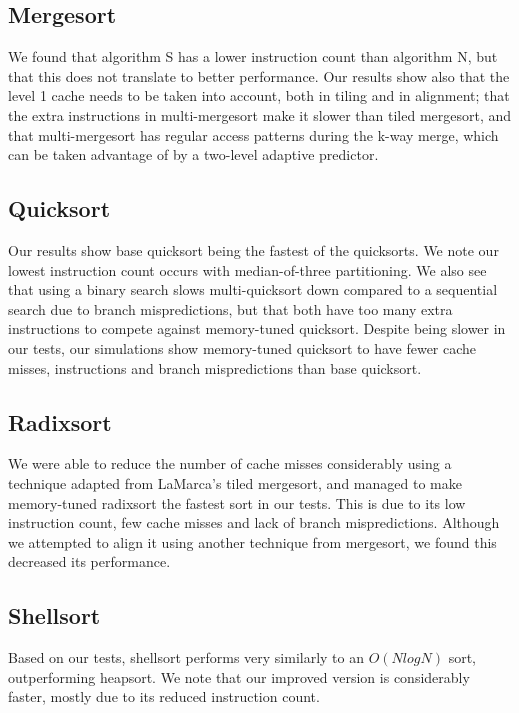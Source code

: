 \subsection{Mergesort}

We found that algorithm S has a lower instruction count than algorithm N, but
that this does not translate to better performance. Our results show also that
the level 1 cache needs to be taken into account, both in tiling and in
alignment; that the extra instructions in multi-mergesort make it slower than
tiled mergesort, and that multi-mergesort has regular access patterns during the
k-way merge, which can be taken advantage of by a two-level adaptive predictor.


\subsection{Quicksort}

Our results show base quicksort being the fastest of the quicksorts. We note our
lowest instruction count occurs with median-of-three partitioning. We also see
that using a binary search slows multi-quicksort down compared to a sequential
search due to branch mispredictions, but that both have too many extra
instructions to compete against memory-tuned quicksort. Despite being slower in
our tests, our simulations show memory-tuned quicksort to have fewer cache
misses, instructions and branch mispredictions than base quicksort.


\subsection{Radixsort}

We were able to reduce the number of cache misses considerably using a technique
adapted from LaMarca's tiled mergesort, and managed to make memory-tuned radixsort the
fastest sort in our tests. This is due to its low instruction count, few cache
misses and lack of branch mispredictions. Although we attempted to align it
using another technique from mergesort, we found this decreased its performance.


\subsection{Shellsort}

Based on our tests, shellsort performs very similarly to an $O(NlogN)$ sort,
outperforming heapsort. We note that our improved version is considerably
faster, mostly due to its reduced instruction count.

